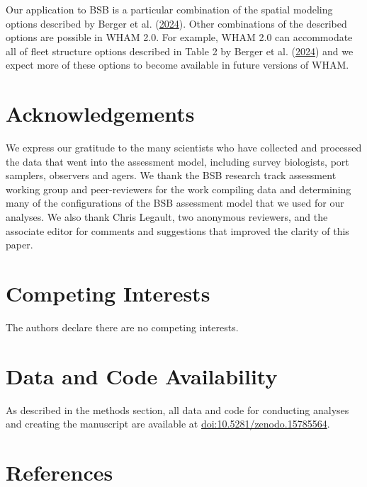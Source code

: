 \documentclass[
]{article}
\begin{document}
Our application to BSB is a particular combination of the spatial modeling options described by Berger et al. (\protect\hyperlink{ref-bergeretal24}{2024}). Other combinations of the described options are possible in WHAM 2.0. For example, WHAM 2.0 can accommodate all of fleet structure options described in Table 2 by Berger et al. (\protect\hyperlink{ref-bergeretal24}{2024}) and we expect more of these options to become available in future versions of WHAM.

\hypertarget{acknowledgements}{%
\section*{Acknowledgements}\label{acknowledgements}}

We express our gratitude to the many scientists who have collected and processed the data that went into the assessment model, including survey biologists, port samplers, observers and agers. We thank the BSB research track assessment working group and peer-reviewers for the work compiling data and determining many of the configurations of the BSB assessment model that we used for our analyses. We also thank Chris Legault, two anonymous reviewers, and the associate editor for comments and suggestions that improved the clarity of this paper.

\hypertarget{competing-interests}{%
\section*{Competing Interests}\label{competing-interests}}

The authors declare there are no competing interests.

\hypertarget{data-and-code-availability}{%
\section*{Data and Code Availability}\label{data-and-code-availability}}

As described in the methods section, all data and code for conducting analyses and creating the manuscript are available at \href{https://doi.org/10.5281/zenodo.15785564}{doi:10.5281/zenodo.15785564}.

\pagebreak

\hypertarget{references}{%
\section*{References}\label{references}}
\end{document}
